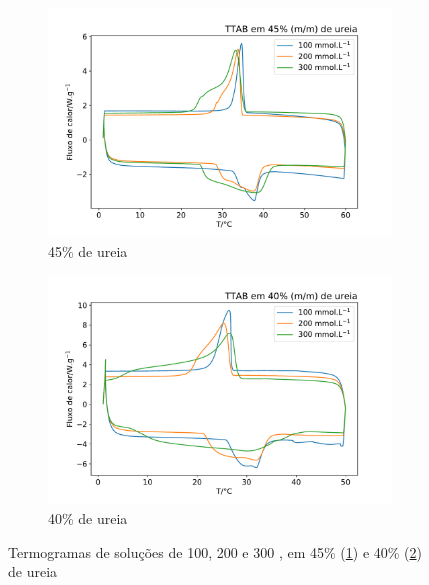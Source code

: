 	\begin{figure}[h]
		\begin{subfigure}[t]{0.5\textwidth}
			\includegraphics[width=\textwidth]{./imagens/dsc/TTAB_45p}
			\caption{45\% de ureia}
			\label{fig:DSC_TTAB_UR45}
		\end{subfigure}%
		\begin{subfigure}[t]{0.5\textwidth}
			\includegraphics[width=\textwidth]{./imagens/dsc/TTAB_40p}
			\caption{40\% de ureia}
			\label{fig:DSC_TTAB_UR40}
		\end{subfigure}
		\caption{Termogramas de soluções de \TTAB{} 100, 200 e 300 \mM{}, em 45\% (\ref{fig:DSC_TTAB_UR45}) e 40\% (\ref{fig:DSC_TTAB_UR40}) de ureia}
		\label{fig:DSC_TTAB_UR_40-45}
	\end{figure}
	
